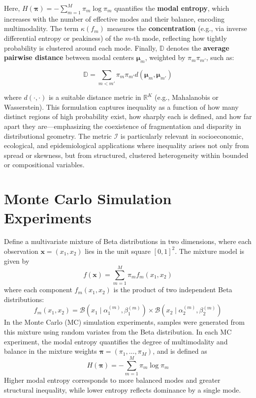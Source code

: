 \documentclass[11pt]{article}
\begin{document}
Here, $H(\boldsymbol{\pi}) = -\sum_{m=1}^{M} \pi_m \log \pi_m$ quantifies the \textbf{modal entropy}, which increases with the number of effective modes and their balance, encoding multimodality. The term $\kappa(f_m)$ measures the \textbf{concentration} (e.g., via inverse differential entropy or peakiness) of the $m$-th mode, reflecting how tightly probability is clustered around each mode. Finally, $\mathbb{D}$ denotes the \textbf{average pairwise distance} between modal centers $\boldsymbol{\mu}_m$, weighted by $\pi_m \pi_{m'}$, such as:

\[
\mathbb{D} = \sum_{m < m'} \pi_m \pi_{m'} d(\boldsymbol{\mu}_m, \boldsymbol{\mu}_{m'})
\]

where $d(\cdot, \cdot)$ is a suitable distance metric in $\mathbb{R}^K$ (e.g., Mahalanobis or Wasserstein). This formulation captures inequality as a function of how many distinct regions of high probability exist, how sharply each is defined, and how far apart they are—emphasizing the coexistence of fragmentation and disparity in distributional geometry. The metric $\mathcal{I}$ is particularly relevant in socioeconomic, ecological, and epidemiological applications where inequality arises not only from spread or skewness, but from structured, clustered heterogeneity within bounded or compositional variables.


\section{Monte Carlo Simulation Experiments}

Define a multivariate mixture of Beta distributions in two dimensions, where each observation $\mathbf{x} = (x_1, x_2)$ lies in the unit square $[0,1]^2$. The mixture model is given by
$$
f(\mathbf{x}) = \sum_{m=1}^{M} \pi_m f_m(x_1, x_2)
$$
where each component $f_m(x_1, x_2)$ is the product of two independent Beta distributions:
$$
f_m(x_1, x_2) = \mathcal{B}(x_1 \mid \alpha_1^{(m)}, \beta_1^{(m)}) \times \mathcal{B}(x_2 \mid \alpha_2^{(m)}, \beta_2^{(m)})
$$
In the Monte Carlo (MC) simulation experiments, samples were generated from this mixture using random variates from the Beta distribution. In each MC experiment, the modal entropy quantifies the degree of multimodality and balance in the mixture weights $\boldsymbol{\pi} = (\pi_1, \dots, \pi_M)$, and is defined as
$$
H(\boldsymbol{\pi}) = -\sum_{m=1}^{M} \pi_m \log \pi_m
$$
Higher modal entropy corresponds to more balanced modes and greater structural inequality, while lower entropy reflects dominance by a single mode.
\end{document}

